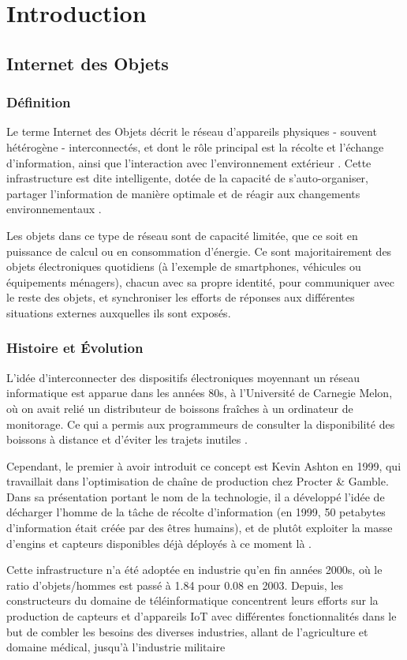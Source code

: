 \chapter{Introduction}

\section{Internet des Objets}

\subsection{Définition}
Le terme Internet des Objets décrit le réseau d'appareils physiques - souvent hétérogène - interconnectés, et dont le rôle principal est la récolte et l'échange d'information, ainsi que l'interaction avec l'environnement extérieur \cite{patel2016}. Cette infrastructure est dite intelligente, dotée de la capacité de s'auto-organiser, partager l'information de manière optimale et de réagir aux changements environnementaux \cite{madakam2015}.\par
Les objets dans ce type de réseau sont de capacité limitée, que ce soit en puissance de calcul ou en consommation d'énergie. Ce sont majoritairement des objets électroniques quotidiens (à l'exemple de smartphones, véhicules ou équipements ménagers), chacun avec sa propre identité, pour communiquer avec le reste des objets, et synchroniser les efforts de réponses aux différentes situations externes auxquelles ils sont exposés.

\subsection{Histoire et Évolution}
L'idée d'interconnecter des dispositifs électroniques moyennant un réseau informatique est apparue dans les années 80s, à l'Université de Carnegie Melon, où on avait relié un distributeur de boissons fraîches à un ordinateur de monitorage. Ce qui a permis aux programmeurs de consulter la disponibilité des boissons à distance et d'éviter les trajets inutiles \cite{madakam2015}.\par
Cependant, le premier à avoir introduit ce concept est Kevin Ashton en 1999, qui travaillait dans l'optimisation de chaîne de production chez Procter \& Gamble. Dans sa présentation portant le nom de la technologie, il a développé l'idée de décharger l'homme de la tâche de récolte d'information (en 1999, 50 petabytes d'information était créée par des êtres humains), et de plutôt exploiter la masse d'engins et capteurs disponibles déjà déployés à ce moment là \cite{ashton2009}.\par
Cette infrastructure n'a été adoptée en industrie qu'en fin années 2000s, où le ratio d'objets/hommes est passé à 1.84 pour 0.08 en 2003. Depuis, les constructeurs du domaine de téléinformatique concentrent leurs efforts sur la production de capteurs et d'appareils IoT avec différentes fonctionnalités dans le but de combler les besoins des diverses industries, allant de l'agriculture et domaine médical, jusqu'à l'industrie militaire

